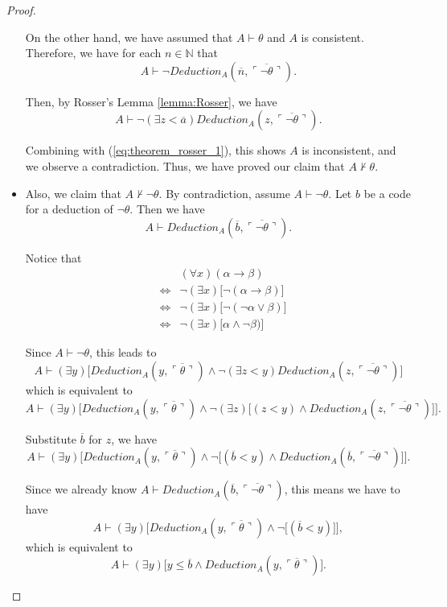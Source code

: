 \documentclass[11pt,letterpaper]{book}
\theoremstyle{definition}
\begin{document}
\begin{proof}
\begin{itemize}
{On the other hand, we have assumed that $A \vdash \theta$ and $A$ is consistent. Therefore, we have for each $n \in \mathbb{N}$ that
$$ A \vdash \lnot Deduction_A (\overline{n}, \overline{ \ulcorner \lnot \theta \urcorner } ) . $$

Then, by Rosser's Lemma \ref{lemma:Rosser}, we have
$$ A \vdash \lnot  (\exists z < \overline{a}) Deduction_A (z, \overline{ \ulcorner \lnot \theta \urcorner } ). $$

Combining with (\ref{eq:theorem_rosser_1}), this shows $A$ is inconsistent, and we observe a contradiction. Thus, we have proved our claim that $A \not \vdash \theta$.
}
\item{Also, we claim that $A \not \vdash \lnot \theta$. By contradiction, assume $A \vdash \lnot \theta$. Let $b$ be a code for a deduction of $\lnot \theta$. Then we have
$$ A \vdash Deduction_A (\overline{b}, \overline{\ulcorner \lnot \theta \urcorner}) . $$

Notice that
\begin{eqnarray*}
&  & (\forall x ) (\alpha \rightarrow \beta) \\
&\iff & \lnot (\exists x) \big[\lnot ( \alpha \rightarrow \beta )  \big] \\
& \iff & \lnot (\exists x)  \big[\lnot ( \lnot \alpha \lor \beta )  \big] \\
& \iff & \lnot (\exists x)  \big[ \alpha \land  \lnot \beta )  \big] 
\end{eqnarray*}

Since $A \vdash \lnot \theta$, this leads to
$$ A \vdash (\exists y ) \bigg[ Deduction_A (y, \overline{\ulcorner \theta \urcorner}) \land \lnot (\exists z < y) Deduction_A (z, \overline{ \ulcorner \lnot \theta \urcorner } ) \bigg]  $$
which is equivalent to
$$ A \vdash (\exists y ) \bigg[ Deduction_A (y, \overline{\ulcorner \theta \urcorner}) \land \lnot (\exists z) \big[ (z  < y ) \land Deduction_A (z, \overline{ \ulcorner \lnot \theta \urcorner } ) \big] \bigg]  .$$

Substitute $\overline{b}$ for $z$, we have
$$ A \vdash (\exists y ) \bigg[ Deduction_A (y, \overline{\ulcorner \theta \urcorner}) \land \lnot  \big[ (\overline{b} < y ) \land Deduction_A (\overline{b}, \overline{ \ulcorner \lnot \theta \urcorner } ) \big] \bigg]  .$$

Since we already know $A \vdash Deduction_A (\overline{b}, \overline{\ulcorner \lnot \theta \urcorner})$, this means we have to have
$$ A \vdash (\exists y ) \bigg[ Deduction_A (y, \overline{\ulcorner \theta \urcorner}) \land \lnot  \big[ (\overline{b} < y )  \big] \bigg]  ,$$
which is equivalent to
\begin{equation}
A \vdash (\exists y ) \bigg[y \leq \overline{b} \land Deduction_A (y, \overline{\ulcorner \theta \urcorner}) \bigg]  .\label{eq:theorem_rosser_2} \tag{**}
\end{equation}

}
\end{itemize}
\end{proof}
\end{document}
